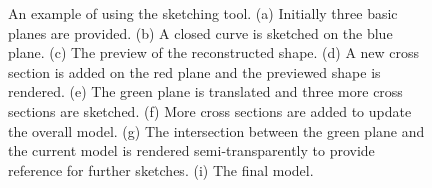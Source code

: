 \begin{figure} [htbp]
  \caption{An example of using the sketching tool.
  (a) Initially three basic planes are provided.
  (b) A closed curve is sketched on the blue plane.
  (c) The preview of the reconstructed shape.
  (d) A new cross section is added on the red plane and the previewed shape is rendered.
  (e) The green plane is translated and three more cross sections are sketched.
  (f) More cross sections are added to update the overall model.
  (g) The intersection between the green plane and the current model is rendered semi-transparently
  to provide reference for further sketches.
  (i) The final model.}
  \label{fig:pig} %
\end{figure}

